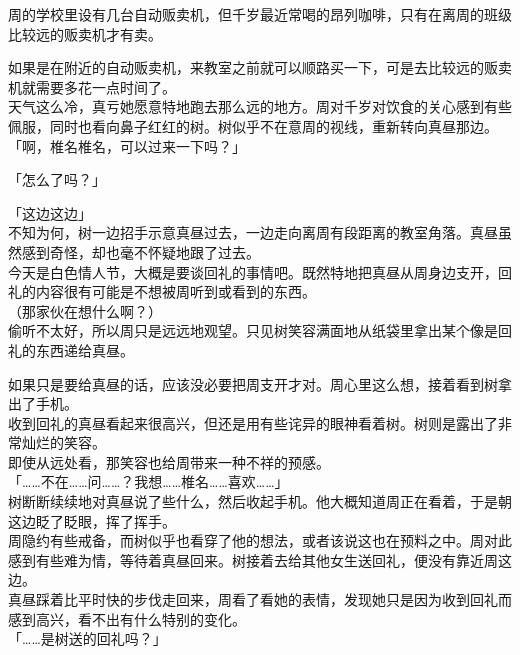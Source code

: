 周的学校里设有几台自动贩卖机，但千岁最近常喝的昂列咖啡，只有在离周的班级比较远的贩卖机才有卖。

如果是在附近的自动贩卖机，来教室之前就可以顺路买一下，可是去比较远的贩卖机就需要多花一点时间了。\\

天气这么冷，真亏她愿意特地跑去那么远的地方。周对千岁对饮食的关心感到有些佩服，同时也看向鼻子红红的树。树似乎不在意周的视线，重新转向真昼那边。\\

「啊，椎名椎名，可以过来一下吗？」

「怎么了吗？」

「这边这边」\\

不知为何，树一边招手示意真昼过去，一边走向离周有段距离的教室角落。真昼虽然感到奇怪，却也毫不怀疑地跟了过去。\\

今天是白色情人节，大概是要谈回礼的事情吧。既然特地把真昼从周身边支开，回礼的内容很有可能是不想被周听到或看到的东西。\\

（那家伙在想什么啊？）\\

偷听不太好，所以周只是远远地观望。只见树笑容满面地从纸袋里拿出某个像是回礼的东西递给真昼。

如果只是要给真昼的话，应该没必要把周支开才对。周心里这么想，接着看到树拿出了手机。\\

收到回礼的真昼看起来很高兴，但还是用有些诧异的眼神看着树。树则是露出了非常灿烂的笑容。\\

即使从远处看，那笑容也给周带来一种不祥的预感。\\

「……不在……问……？我想……椎名……喜欢……」\\

树断断续续地对真昼说了些什么，然后收起手机。他大概知道周正在看着，于是朝这边眨了眨眼，挥了挥手。\\

周隐约有些戒备，而树似乎也看穿了他的想法，或者该说这也在预料之中。周对此感到有些难为情，等待着真昼回来。树接着去给其他女生送回礼，便没有靠近周这边。\\

真昼踩着比平时快的步伐走回来，周看了看她的表情，发现她只是因为收到回礼而感到高兴，看不出有什么特别的变化。\\

「……是树送的回礼吗？」

